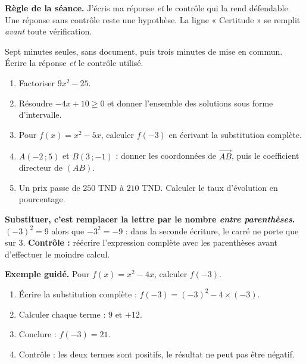 \documentclass[10pt,a4paper]{article}
\begin{document}
\begin{graybox}\small\textbf{Règle de la séance.} J'écris ma réponse \emph{et} le contrôle qui la rend défendable. Une réponse sans contrôle reste une hypothèse. La ligne « Certitude » se remplit \emph{avant} toute vérification.\end{graybox}
\par\vspace{2mm}
Sept minutes seules, sans document, puis trois minutes de mise en commun. Écrire la réponse \emph{et} le contrôle utilisé.
\begin{enumerate}
\item Factoriser $9x^2 - 25$.
\item Résoudre $-4x + 10 \ge 0$ et donner l'ensemble des solutions sous forme d'intervalle.
\item Pour $f(x)=x^2-5x$, calculer $f(-3)$ en écrivant la substitution complète.
\item $A(-2\,;5)$ et $B(3\,;-1)$ : donner les coordonnées de $\vec{AB}$, puis le coefficient directeur de $(AB)$.
\item Un prix passe de $250$ TND à $210$ TND. Calculer le taux d'évolution en pourcentage.
\end{enumerate}
\certline
\aideline
\needspace{62mm}\par\vspace{3mm}
\begin{methodbox}
\textbf{Substituer, c'est remplacer la lettre par le nombre \emph{entre parenthèses}.}
$(-3)^2 = 9$ alors que $-3^2 = -9$ : dans la seconde écriture, le carré ne porte que sur $3$.
\textbf{Contrôle :} réécrire l'expression complète avec les parenthèses avant d'effectuer le moindre calcul.
\end{methodbox}
\begin{graybox}
\textbf{Exemple guidé.} Pour $f(x) = x^2 - 4x$, calculer $f(-3)$.
\begin{enumerate}
\item Écrire la substitution complète : $f(-3) = (-3)^2 - 4\times(-3)$.
\item Calculer chaque terme : $9$ et $+12$.
\item Conclure : $f(-3) = 21$.
\item Contrôle : les deux termes sont positifs, le résultat ne peut pas être négatif.
\end{enumerate}
\end{graybox}
\end{document}
